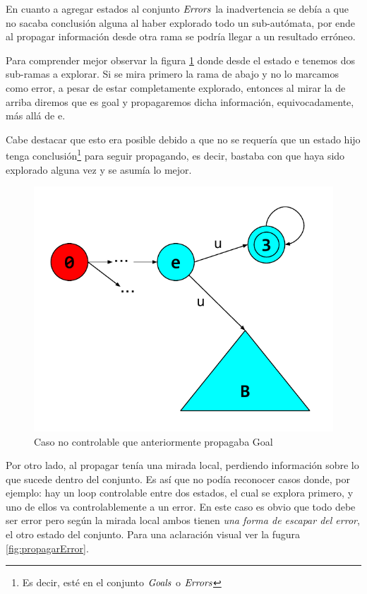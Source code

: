 En cuanto a agregar estados al conjunto $\mathit{Errors}$ la inadvertencia se debía a que no sacaba conclusión alguna al haber explorado todo un sub-autómata, por ende al propagar información desde otra rama se podría llegar a un resultado erróneo. 

Para comprender mejor observar la figura \ref{fig:falenciasErrores} donde desde el estado e tenemos dos sub-ramas a explorar. Si se mira primero la rama de abajo y no lo marcamos como error, a pesar de estar completamente explorado, entonces al mirar la de arriba diremos que es goal y propagaremos dicha información, equivocadamente, más allá de e. 

Cabe destacar que esto era posible debido a que no se requería que un estado hijo tenga conclusión\footnote{Es decir, esté en el conjunto $\mathit{Goals}$ o $\mathit{Errors}$} para seguir propagando, es decir, bastaba con que haya sido explorado alguna vez y se asumía lo mejor.
\begin{figure}[htb]
 \centering
 \includegraphics[width=\linewidth/2]{figures/FalenciasErrores.pdf}
 \caption{Caso no controlable que anteriormente propagaba Goal}
 \label{fig:falenciasErrores}
\end{figure}

Por otro lado, al propagar tenía una mirada local, perdiendo información sobre lo que sucede dentro del conjunto. Es así que no podía reconocer casos donde, por ejemplo: hay un loop controlable entre dos estados, el cual se explora primero, y uno de ellos va controlablemente a un error. En este caso es obvio que todo debe ser error pero según la mirada local ambos tienen \textit{una forma de escapar del error}, el otro estado del conjunto. Para una aclaración visual ver la fugura \ref{fig:propagarError}.

